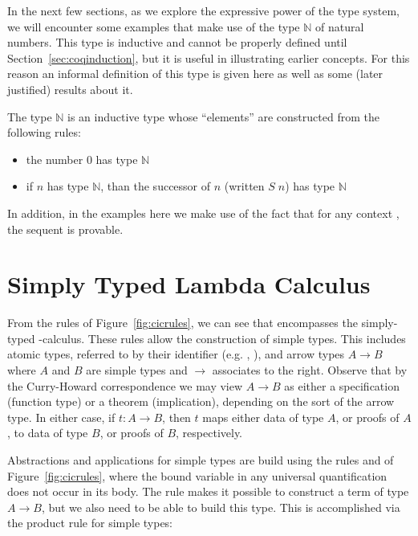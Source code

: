 In the next few sections, as we explore the expressive power of the \coc{} type system, we will encounter some examples that make use of the type $\mathbb{N}$ of natural numbers. This type is inductive and cannot be properly defined until Section~\ref{sec:coqinduction}, but it is useful in illustrating earlier concepts. For this reason an informal definition of this type is given here as well as some (later justified) results about it.

The type $\mathbb{N}$ is an inductive type whose ``elements'' are constructed from the following rules:
\begin{itemize}
 \item the number 0 has type $\mathbb{N}$
 \item if $n$ has type $\mathbb{N}$, than the successor of $n$ (written $\mathit{S} \; n$) has type $\mathbb{N}$
\end{itemize}
In addition, in the examples here we make use of the fact that for any context \dyncon{}, the sequent  is provable.

\section{Simply Typed Lambda Calculus}
\label{sec:stlc}


From the rules of Figure~\ref{fig:cicrules}, we can see that \coc{} encompasses the simply-typed \lambda-calculus. These rules allow the construction of simple types. This includes atomic types, referred to by their identifier (e.g. \N, \Z), and arrow types $A \rightarrow B$ where $A$ and $B$ are simple types and $\rightarrow$ associates to the right. Observe that by the Curry-Howard correspondence we may view $A \rightarrow B$ as either a specification (function type) or a theorem (implication), depending on the sort of the arrow type. In either case, if $t : A \rightarrow B$, then $t$ maps either data of type $A$, or proofs of $A$, to data of type $B$, or proofs of $B$, respectively.

Abstractions and applications for simple types are build using the rules  and  of Figure~\ref{fig:cicrules}, where the bound variable in any universal quantification does not occur in its body. The rule  makes it possible to construct a term of type $A \rightarrow B$, but we also need to be able to build this type. This is accomplished via the product rule for simple types:


